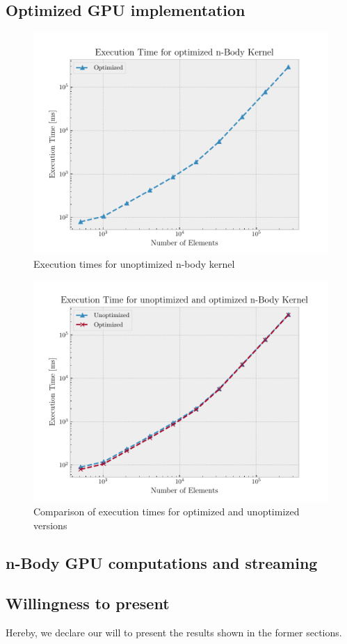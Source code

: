 \documentclass[12pt]{article}
\begin{document}
\subsection{Optimized GPU implementation}
\begin{figure}[htpb]
	\centering
	\includegraphics[width=0.8\linewidth]{./plot/time_vs_elems_opt.pdf}
	\caption{Execution times for unoptimized n-body kernel}%
	\label{fig:time_vs_elems_opt}
\end{figure}

\begin{figure}[htpb]
	\centering
	\includegraphics[width=0.8\linewidth]{./plot/time_vs_elems_both.pdf}
	\caption{Comparison of execution times for optimized and unoptimized versions}%
	\label{fig:time_vs_elems_both}
\end{figure}

\subsection{n-Body GPU computations and streaming}

\subsection{Willingness to present}
Hereby, we declare our will to present the results shown in the former sections.
\end{document}
